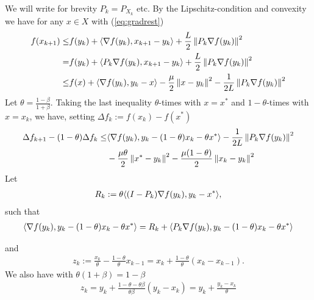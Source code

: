 \documentclass[12pt,english]{article}
\begin{document}
We will write for brevity $P_k = P_{X_k}$ etc.
By the Lipschitz-condition and convexity we have for any $x\in X$ with (\ref{eq:gradrest})
%
\begin{align*}
f(x_{k+1}) \le& f(y_k) + \langle\nabla f(y_k),x_{k+1}-y_k\rangle + \frac{L}{2}\left\|P_k\nabla f(y_k)\right\|^2\\
=&  f(y_k) + \langle P_k \nabla f(y_k),x_{k+1}-y_k\rangle + \frac{L}{2}\left\|P_k\nabla f(y_k)\right\|^2\\
\le& f(x) + \langle\nabla f(y_k),y_k-x\rangle-\frac{\mu}{2}\left\|x-y_k\right\|^2 - \frac{1}{2L}\left\|P_k\nabla f(y_k)\right\|^2
\end{align*}
%
Let $\theta = \frac{1-\beta}{1+\beta}$. Taking the last inequality $\theta$-times with $x=x^*$ and 
$1-\theta$-times with $x=x_k$, we have, setting $\Delta f_k:=f(x_k)-f(x^*)$
%
\begin{align*}
\Delta f_{k+1} - (1-\theta)\Delta f_k \le& \langle\nabla f(y_k),y_k-(1-\theta) x_k -\theta x^*\rangle - \frac{1}{2L}\left\|P_k\nabla f(y_k)\right\|^2\\&-\frac{\mu\theta}{2}\left\|x^*-y_k\right\|^2-\frac{\mu(1-\theta)}{2}\left\|x_k-y_k\right\|^2
\end{align*}
%
Let
%
\begin{align*}
R_k := \theta\langle(I-P_k)\nabla f(y_k),y_k-x^*\rangle,
\end{align*}
%
such that
%
\begin{align*}
\langle\nabla f(y_k),y_k-(1-\theta) x_k -\theta x^*\rangle = R_k + \langle P_k\nabla f(y_k),y_k-(1-\theta) x_k -\theta x^*\rangle
\end{align*}
%

and
%
\begin{align*}
z_k := \frac{x_k}{\theta} -\frac{1-\theta}{\theta}x_{k-1}= x_k +\frac{1-\theta}{\theta}(x_k-x_{k-1}).
\end{align*}
%
We also have with $\theta(1+\beta) = 1-\beta$
%
\begin{align*}
z_k = y_k  + \frac{1-\theta-\theta\beta}{\theta\beta}(y_k-x_{k})= y_k  + \frac{y_k-x_{k}}{\theta}
\end{align*}
%
\end{document}
